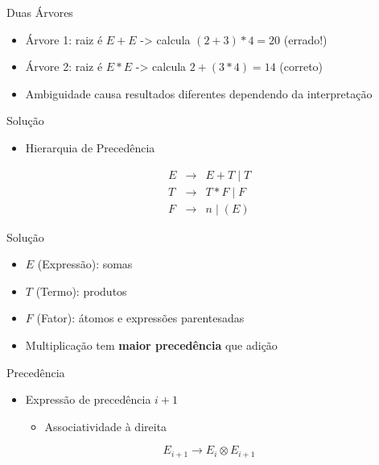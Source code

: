 \begin{frame}{Duas Árvores}

    \begin{itemize}

        \item
        Árvore 1: raiz é \(E+E\) -> calcula \((2+3)*4 = 20\) (errado!)
        \item
        Árvore 2: raiz é \(E*E\) -> calcula \(2+(3*4) = 14\) (correto)
        \item
        Ambiguidade causa resultados diferentes dependendo da interpretação
    \end{itemize}
\end{frame}

\begin{frame}{Solução}

    \begin{itemize}

        \item
        Hierarquia de Precedência
    \end{itemize}

    \[\begin{array}{lcl}
    E &\to& E + T \mid T \\
    T &\to& T * F \mid F \\
    F &\to& n \mid (E)
\end{array}\]
\end{frame}

\begin{frame}{Solução}

    \begin{itemize}

        \item
        \(E\) (Expressão): somas
        \item
        \(T\) (Termo): produtos
        \item
        \(F\) (Fator): átomos e expressões parentesadas
        \item
        Multiplicação tem \textbf{maior precedência} que adição
    \end{itemize}
\end{frame}

\begin{frame}{Precedência}

    \begin{itemize}

        \item
        Expressão de precedência \(i+1\)

        \begin{itemize}

            \item
            Associatividade à direita
        \end{itemize}
    \end{itemize}

    \[
    E_{i + 1} \to E_i \otimes E_{i + 1}
    \]
\end{frame}

